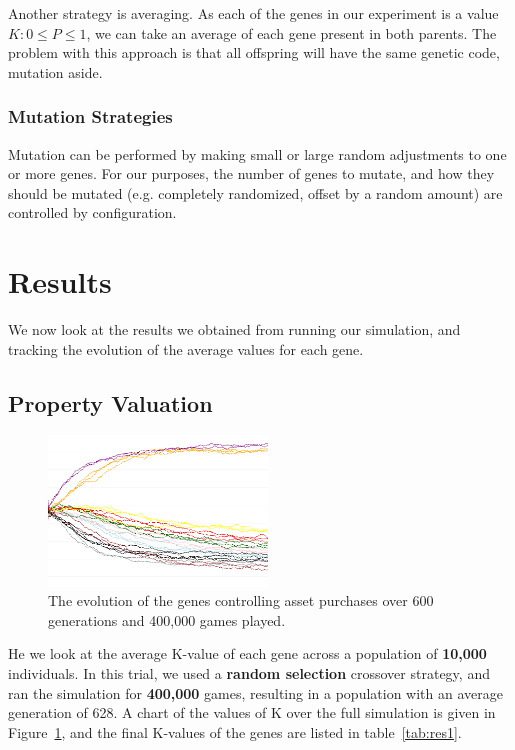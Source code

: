\documentclass[11pt,a4paper,twocolumn]{scrartcl}
\begin{document}
Another strategy is averaging. As each of the genes in our experiment is a value $K : 0 \leq P \leq 1$, we can take an average of each gene present in both parents. The problem with this approach is that all offspring will have the same genetic code, mutation aside.

\subsubsection{Mutation Strategies}

Mutation can be performed by making small or large random adjustments to one or more genes. For our purposes, the number of genes to mutate, and how they should be mutated (e.g. completely randomized, offset by a random amount) are controlled by configuration.

\section{Results}
\label{sec:res}

We now look at the results we obtained from running our simulation, and tracking the evolution of the average values for each gene.

\subsection{Property Valuation}

\begin{figure}
\includegraphics[width=\textwidth,height=4cm]{1.png}
\caption{The evolution of the genes controlling asset purchases over 600 generations and 400,000 games played.}
\label{fig:res1}
\end{figure}


He we look at the average K-value of each gene across a population of \textbf{10,000} individuals. In this trial, we used a \textbf{random selection} crossover strategy, and ran the simulation for \textbf{400,000} games, resulting in a population with an average generation of 628. A chart of the values of K over the full simulation is given in Figure~\ref{fig:res1}, and the final K-values of the genes are listed in table~\ref{tab:res1}.
\end{document}
